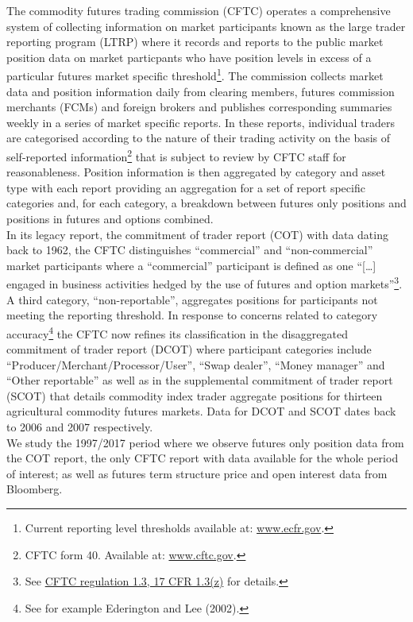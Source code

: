 \documentclass[]{elsarticle} %
\begin{document}
The commodity futures trading commission (CFTC) operates a comprehensive
system of collecting information on market participants known as the
large trader reporting program (LTRP) where it records and reports to
the public market position data on market particpants who have position
levels in excess of a particular futures market specific
threshold\footnote{Current reporting level thresholds available at:
  \href{https://www.ecfr.gov/cgi-bin/retrieveECFR?gp=\&SID=970471b8455f4bab7db4110cfde50731\&mc=true\&r=SECTION\&n=se17.1.15_103}{www.ecfr.gov}.}.
The commission collects market data and position information daily from
clearing members, futures commission merchants (FCMs) and foreign
brokers and publishes corresponding summaries weekly in a series of
market specific reports. In these reports, individual traders are
categorised according to the nature of their trading activity on the
basis of self-reported information\footnote{CFTC form 40. Available at:
  \href{https://www.cftc.gov/sites/default/files/idc/groups/public/@forms/documents/file/cftcform40.pdf}{www.cftc.gov}.}
that is subject to review by CFTC staff for reasonableness. Position
information is then aggregated by category and asset type with each
report providing an aggregation for a set of report specific categories
and, for each category, a breakdown between futures only positions and
positions in futures and options combined.\\
In its legacy report, the commitment of trader report (COT) with data
dating back to 1962, the CFTC distinguishes ``commercial'' and
``non-commercial'' market participants where a ``commercial''
participant is defined as one ``{[}\ldots{}{]} engaged in business
activities hedged by the use of futures and option markets''\footnote{See
  \href{https://www.gpo.gov/fdsys/pkg/CFR-1998-title17-vol1/xml/CFR-1998-title17-vol1-sec1-3.xml}{CFTC
  regulation 1.3, 17 CFR 1.3(z)} for details.}. A third category,
``non-reportable'', aggregates positions for participants not meeting
the reporting threshold. In response to concerns related to category
accuracy\footnote{See for example Ederington and Lee (2002).} the CFTC
now refines its classification in the disaggregated commitment of trader
report (DCOT) where participant categories include
``Producer/Merchant/Processor/User'', ``Swap dealer'', ``Money manager''
and ``Other reportable'' as well as in the supplemental commitment of
trader report (SCOT) that details commodity index trader aggregate
positions for thirteen agricultural commodity futures markets. Data for
DCOT and SCOT dates back to 2006 and 2007 respectively.\\
We study the 1997/2017 period where we observe futures only position
data from the COT report, the only CFTC report with data available for
the whole period of interest; as well as futures term structure price
and open interest data from Bloomberg.
\end{document}

